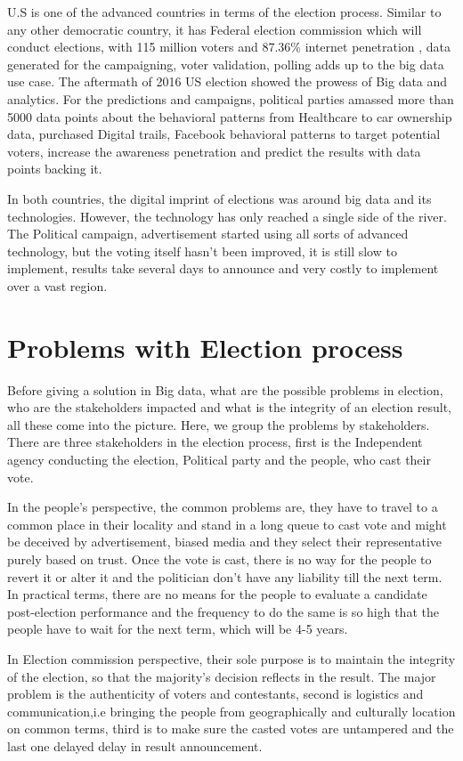 \documentclass[sigconf]{acmart}
\begin{document}
 U.S is one of the advanced countries in terms of the election process. Similar to any other democratic country, it has Federal election commission which will conduct elections, with 115 million voters and 87.36\% internet penetration \cite{8:online}, data generated for the campaigning, voter validation, polling adds up to the big data use case. 
 The aftermath of 2016 US election showed the prowess of Big data and analytics. For the predictions and campaigns, political parties amassed more than 5000 data points about the behavioral patterns from Healthcare to car ownership data, purchased Digital trails, Facebook behavioral patterns to target potential voters, increase the awareness penetration and predict the results with data points backing it\cite{9:online}.
 
 In both countries, the digital imprint of elections was around big data and its technologies. However, the technology has only reached a single side of the river. The Political campaign, advertisement started using all sorts of advanced technology, but the voting itself hasn't been improved, it is still slow to implement, results take several days to announce and very costly to implement over a vast region.
 
 \section{Problems with Election process}
Before giving a solution in Big data, what are the possible problems in election, who are the stakeholders impacted and what is the integrity of an election result, all these come into the picture.
Here, we group the problems by stakeholders. There are three stakeholders in the election process, first is the Independent agency conducting the election, Political party and the people, who cast their vote.

In the people's perspective, the common problems are, they have to travel to a common place in their locality and stand in a long queue to cast vote and might be deceived by advertisement, biased media and they select their representative purely based on trust. Once the vote is cast, there is no way for the people to revert it or alter it and the politician don't have any liability till the next term. In practical terms, there are no means for the people to evaluate a candidate post-election performance and the frequency to do the same is so high that the people have to wait for the next term, which will be 4-5 years.

In Election commission perspective, their sole purpose is to maintain the integrity of the election, so that the majority's decision reflects in the result. The major problem is the authenticity of voters and contestants, second is logistics and communication,i.e bringing the people from geographically and culturally location on common terms, third is to make sure the casted votes are untampered and the last one delayed delay in result announcement.
\end{document}
